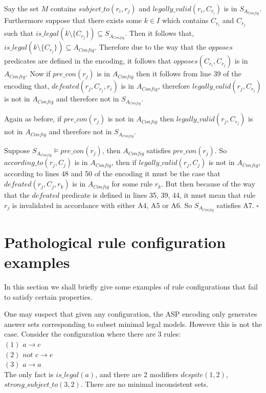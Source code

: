 Say the set $M$ contains $subject\_to(r_{i}, r_{j})$ and
$legally\_valid(r_{i}, C_{r_{i}})$ is in $S_{A_{Config}}$. Furthermore suppose
that there exists some $k\in I$ which contains $C_{r_{i}}$ and $C_{r_{j}}$
such that $is\_legal(k\setminus \{C_{r_{j}}\})\subseteq S_{A_{Config}}$. Then
it follows that, $is\_legal(k\setminus \{C_{r_{j}}\})\subseteq
A_{Config}$. Therefore due to the way that the $opposes$ predicates are
defined in the encoding, it follows that $opposes(C_{r_{i}}, C_{r_{j}})$ is in
$A_{Config}$. Now if $pre\_con(r_{j})$ is in $A_{Config}$ then it follows from
line 39 of the encoding that, $defeated(r_{j}, C_{r_{j}}, r_{i}) $ is in
$A_{Config}$, therefore $legally\_valid(r_{j}, C_{r_{j}})$ is not in
$A_{Config}$ and therefore not in $S_{A_{Config}}$.

Again as before, if $pre\_con(r_{j})$ is not in $A_{Config}$ then
$legally\_valid(r_{j}, C_{r_{j}})$ is not in $A_{Config}$ and therefore not in
$S_{A_{Config}}$.

Suppose $S_{A_{Config}}\models pre\_con(r_{j})$, then $A_{Config}$ satisfies
$pre\_con(r_{j})$. So $according\_to(r_{j},C_{j})$ is in $A_{Config}$, then if
$legally\_valid(r_{j}, C_{j})$ is not in $A_{Config}$, according to lines 48
and 50 of the encoding it must be the case that $defeated(r_{j},C_{j},r_{k})$
is in $A_{Config}$ for some rule $r_{k}$. But then because of the way that the
$defeated$ predicate is defined in lines 35, 39, 44, it must mean that rule
$r_{j}$ is invalidated in accordance with either A4, A5 or A6. So
$S_{A_{Config}}$ satisfies A7. $\square$

\section{Pathological rule configuration examples}
In this section we shall briefly give some examples of rule configurations
that fail to satisfy certain properties.

One may suspect that given any configuration, the ASP encoding only generates answer sets corresponding to subset minimal legal models. However this is not the case. Consider the configuration where there are 3 rules:\\ 
$(1)$ $a\rightarrow c$\\
$(2)$ $not$ $c\rightarrow e$\\
$(3)$ $a\rightarrow a$\\
The only fact is $is\_legal(a)$, and there are 2 modifiers $despite(1,2)$, $strong\_subject\_to(3,2)$. There are no minimal inconsistent sets.\\

